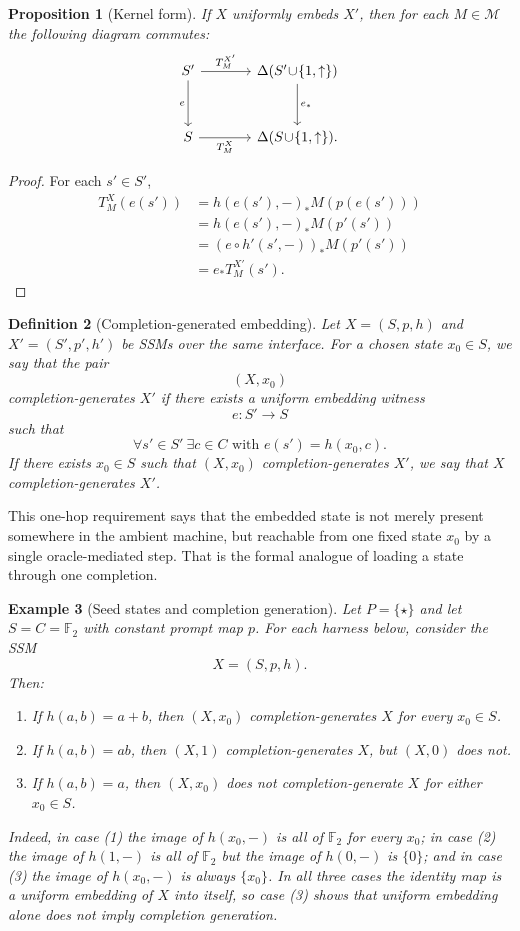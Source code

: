 \documentclass[11pt]{article}
\newtheorem{definition}{Definition}[section]
\newtheorem{proposition}[definition]{Proposition}
\newtheorem{example}[definition]{Example}
\begin{document}
\begin{proposition}[Kernel form]\label{prop:kernel-form}
If $X$ uniformly embeds $X'$, then for each $M\in\mathcal{M}$ the following diagram commutes:
\[
\begin{tikzcd}[column sep=3.6em,row sep=3.0em]
S' \arrow[r,"T_M^{X'}"] \arrow[d,"e"'] & \Delta(S'\!\cup\!\{1,\uparrow\}) \arrow[d,"e_*"] \\
S \arrow[r,"T_M^{X}"'] & \Delta(S\!\cup\!\{1,\uparrow\}).
\end{tikzcd}
\]
\end{proposition}

\begin{proof}
For each $s'\in S'$,
\begin{align*}
T_M^X(e(s'))
&=h(e(s'),-)_{*}M(p(e(s')))\\
&=h(e(s'),-)_{*}M(p'(s'))\\
&=(e\circ h'(s',-))_*M(p'(s'))\\
&=e_*T_M^{X'}(s').
\end{align*}
\end{proof}


\begin{definition}[Completion-generated embedding]
Let $X=(S,p,h)$ and $X'=(S',p',h')$ be SSMs over the same interface. For a chosen state $x_0\in S$, we say that the pair
\[
(X,x_0)
\]
\emph{completion-generates} $X'$ if there exists a uniform embedding witness
\[
e:S'\to S
\]
such that
\[
\forall s'\in S'\ \exists c\in C\text{ with } e(s')=h(x_0,c).
\]
If there exists $x_0\in S$ such that $(X,x_0)$ completion-generates $X'$, we say that $X$ \emph{completion-generates} $X'$.
\end{definition}

This one-hop requirement says that the embedded state is not merely present somewhere in the ambient machine, but reachable from one fixed state $x_0$ by a single oracle-mediated step. That is the formal analogue of loading a state through one completion.

\begin{example}[Seed states and completion generation]\label{ex:seeds}
Let $P=\{\star\}$ and let $S=C=\mathbb{F}_2$ with constant prompt map $p$. For each harness below, consider the SSM
\[
X=(S,p,h).
\]
Then:
\begin{enumerate}[label=(\arabic*)]
    \item If $h(a,b)=a+b$, then $(X,x_0)$ completion-generates $X$ for every $x_0\in S$.
    \item If $h(a,b)=ab$, then $(X,1)$ completion-generates $X$, but $(X,0)$ does not.
    \item If $h(a,b)=a$, then $(X,x_0)$ does not completion-generate $X$ for either $x_0\in S$.
\end{enumerate}
Indeed, in case (1) the image of $h(x_0,-)$ is all of $\mathbb{F}_2$ for every $x_0$; in case (2) the image of $h(1,-)$ is all of $\mathbb{F}_2$ but the image of $h(0,-)$ is $\{0\}$; and in case (3) the image of $h(x_0,-)$ is always $\{x_0\}$. In all three cases the identity map is a uniform embedding of $X$ into itself, so case (3) shows that uniform embedding alone does not imply completion generation.
\end{example}
\end{document}
